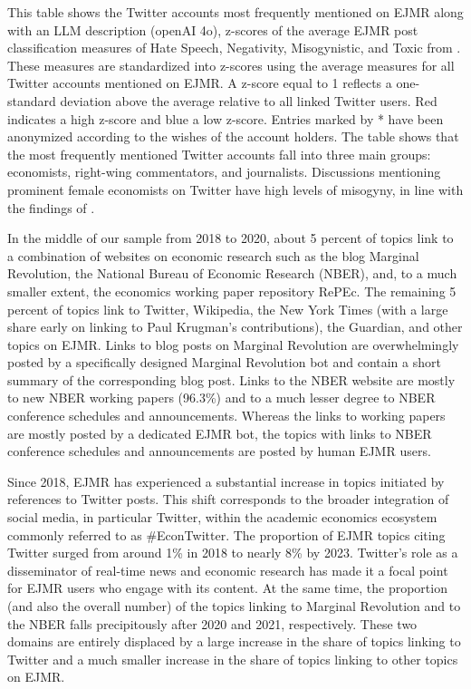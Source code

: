 \documentclass[PP]{AEA}
\begin{document}
\begin{table}
\caption{Top 50 Twitter accounts mentioned on EJMR}
\begin{tablenotes}
This table shows the Twitter accounts most frequently mentioned on EJMR along with an LLM description (openAI 4o), z-scores of the average EJMR post classification measures of Hate Speech, Negativity, Misogynistic, and Toxic from \citet{ederer2024anonymity}. These measures are standardized into z-scores using the average measures for all Twitter accounts mentioned on EJMR. A z-score equal to 1 reflects a one-standard deviation above the average relative to all linked Twitter users. Red indicates a high z-score and blue a low z-score. Entries marked by * have been anonymized according to the wishes of the account holders. The table shows that the most frequently mentioned Twitter accounts fall into three main groups: economists, right-wing commentators, and journalists. Discussions mentioning prominent female economists on Twitter have high levels of misogyny, in line with the findings of \cite{wu2018gendered,wu2020gender}.
\end{tablenotes}
\end{table}

In the middle of our sample from 2018 to 2020, about 5 percent of topics link to a combination of websites on economic research such as the blog Marginal Revolution, the National Bureau of Economic Research (NBER), and, to a much smaller extent, the economics working paper repository RePEc. The remaining 5 percent of topics link to Twitter, Wikipedia, the New York Times (with a large share early on linking to Paul Krugman's contributions), the Guardian, and other topics on EJMR. Links to blog posts on Marginal Revolution are overwhelmingly posted by a specifically designed Marginal Revolution bot and contain a short summary of the corresponding blog post. Links to the NBER website are mostly to new NBER working papers (96.3\%) and to a much lesser degree to NBER conference schedules and announcements. Whereas the links to working papers are mostly posted by a dedicated EJMR bot, the topics with links to NBER conference schedules and announcements are posted by human EJMR users. 

Since 2018, EJMR has experienced a substantial increase in topics initiated by references to Twitter posts. This shift corresponds to the broader integration of social media, in particular Twitter, within the academic economics ecosystem commonly referred to as \#EconTwitter. The proportion of EJMR topics citing Twitter surged from around 1\% in 2018 to nearly 8\% by 2023. Twitter's role as a disseminator of real-time news and economic research has made it a focal point for EJMR users who engage with its content. At the same time, the proportion (and also the overall number) of the topics linking to Marginal Revolution and to the NBER falls precipitously after 2020 and 2021, respectively. These two domains are entirely displaced by a large increase in the share of topics linking to Twitter and a much smaller increase in the share of topics linking to other topics on EJMR. 
\end{document}
